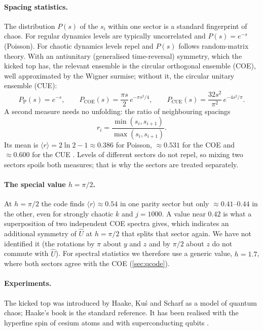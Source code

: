 \documentclass[11pt,a4paper]{article}
\begin{document}
\paragraph{Spacing statistics.} The distribution $P(s)$ of the $s_i$ within one sector is a standard fingerprint of
chaos. For regular dynamics levels are typically uncorrelated and $P(s) = e^{-s}$ (Poisson). For chaotic dynamics
levels repel and $P(s)$ follows random-matrix theory. With an antiunitary (generalised time-reversal) symmetry, which
the kicked top has, the relevant ensemble is the circular orthogonal ensemble (COE), well approximated by the Wigner
surmise; without it, the circular unitary ensemble (CUE):
\begin{equation}\label{eq:wigner}
  P_{\mathrm{P}}(s) = e^{-s}, \qquad P_{\mathrm{COE}}(s) = \frac{\pi s}{2}\,e^{-\pi s^2/4}, \qquad
  P_{\mathrm{CUE}}(s) = \frac{32 s^2}{\pi^2}\,e^{-4s^2/\pi} .
\end{equation}
A second measure needs no unfolding: the ratio of neighbouring spacings
\begin{equation}\label{eq:gap-ratio}
  r_i = \frac{\min(s_i, s_{i+1})}{\max(s_i, s_{i+1})} .
\end{equation}
Its mean is $\langle r\rangle = 2\ln2 - 1 \approx 0.386$ for Poisson, $\approx 0.531$ for the COE and $\approx 0.600$
for the CUE \cite{Atas2013}. Levels of different sectors do not repel, so mixing two sectors spoils both measures;
that is why the sectors are treated separately.

\paragraph{The special value $h = \pi/2$.} At $h = \pi/2$ the code finds $\langle r\rangle \approx 0.54$ in one parity
sector but only $\approx 0.41$--$0.44$ in the other, even for strongly chaotic $k$ and $j = 1000$. A value near
$0.42$ is what a superposition of two independent COE spectra gives, which indicates an additional symmetry of
$\hat U$ at $h = \pi/2$ that splits that sector again. We have not identified it (the rotations by $\pi$ about $y$ and
$z$ and by $\pi/2$ about $z$ do not commute with $\hat U$). For spectral statistics we therefore use a generic value,
$h = 1.7$, where both sectors agree with the COE (\cref{sec:qcode}).

\paragraph{Experiments.} The kicked top was introduced by Haake, Ku\'s and Scharf \cite{HKS1987} as a model of quantum
chaos; Haake's book \cite{Haake} is the standard reference. It has been realised with the hyperfine spin of cesium
atoms \cite{Chaudhury2009} and with superconducting qubits \cite{Neill2016}.
\end{document}
